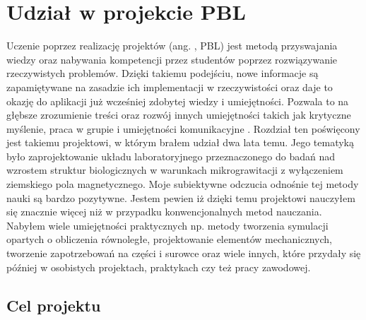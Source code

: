 \graphicspath{{./PBL/images}}

\chapter{Udział w projekcie PBL}

Uczenie poprzez realizację projektów (ang. , PBL) jest metodą przyswajania wiedzy oraz nabywania kompetencji przez studentów poprzez rozwiązywanie rzeczywistych problemów. Dzięki takiemu podejściu, nowe informacje są zapamiętywane na zasadzie ich implementacji w rzeczywistości oraz daje to okazję do aplikacji już wcześniej zdobytej wiedzy i umiejętności. Pozwala to na głębsze zrozumienie treści oraz rozwój innych umiejętności takich jak krytyczne myślenie, praca w grupie i umiejętności komunikacyjne \cite{bib:PBL}. Rozdział ten poświęcony jest takiemu projektowi, w którym brałem udział dwa lata temu. Jego tematyką było zaprojektowanie układu laboratoryjnego przeznaczonego do badań nad wzrostem struktur biologicznych w warunkach mikrograwitacji z wyłączeniem ziemskiego pola magnetycznego. Moje subiektywne odczucia odnośnie tej metody nauki są bardzo pozytywne. Jestem pewien iż dzięki temu projektowi nauczyłem się znacznie więcej niż w przypadku konwencjonalnych metod nauczania. Nabyłem wiele umiejętności praktycznych np. metody tworzenia symulacji opartych o obliczenia równoległe, projektowanie elementów mechanicznych, tworzenie zapotrzebowań na części i surowce oraz wiele innych, które przydały się później w osobistych projektach, praktykach czy też pracy zawodowej.

\section{Cel projektu} \label{cel_projektu}

